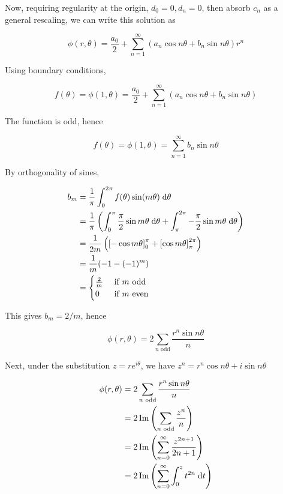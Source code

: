 \documentclass[a4paper]{article}
\begin{document}
Now, requiring regularity at the origin, $ d_{0}=0,d_{n} = 0 $, then absorb $ c_{n} $ as a general rescaling, we can write this solution as

\[ \phi(r,\theta)  = \frac{a_{0}}{2} + \sum_{n=1}^{\infty} (a_{n}  \cos n \theta + b_{n} \sin n \theta ) r^{n}  \]

Using boundary conditions,

\[ f(\theta) = \phi(1,\theta)  = \frac{a_{0}}{2} + \sum_{n=1}^{\infty} (a_{n}  \cos n \theta + b_{n} \sin n \theta ) \]


The function is odd, hence 

\[ f(\theta) = \phi(1,\theta)  = \sum_{n=1}^{\infty} b_{n} \sin n \theta \]

By orthogonality of sines, 

\begin{align*}
b_{m} & = \frac{1}{\pi} \int_{0}^{2 \pi} f(\theta) \sin (m \theta) \; \mathrm{d} \theta\\
& = \frac{1}{\pi} \left(  \int_{0}^{\pi} \frac{\pi}{2}  \sin m \theta  \; \mathrm{d} \theta + \int_{\pi}^{2\pi} - \frac{\pi}{2}  \sin m \theta \; \mathrm{d} \theta \right)   \\
& = \frac{1}{2m}  \left(  \left[  - \cos m \theta  \right]_{0}^{\pi}  + \left[  \cos m \theta \right]_{\pi}^{2\pi}  \right)  \\
& = \frac{1}{m} ( -1 - (-1)^{m}) \\
& = \begin{cases} \frac{2}{m}  & \text{ if } m \text{ odd} \\ 0 & \text{ if } m \text{ even} \end{cases}
\end{align*}

This gives $ b_{m} = 2 / m $, hence

\[ \phi(r,\theta)  = 2 \sum_{n \text{ odd}}  \frac{ r^{n} \sin n \theta }{n}  \]

Next, under the substitution $ z = r e^{i \theta} $, we have $ z^{n} = r^{n} \cos n \theta + i \sin n \theta $

\begin{align*}
\phi(r,\theta) & = 2 \sum_{n \text{ odd}}  \frac{ r^{n} \sin n \theta }{n} \\
& = 2 \operatorname{Im} \left( \sum_{n \text{ odd}} \frac{z^{n}}{n}  \right) \\
& = 2 \operatorname{Im} \left( \sum_{n = 0}^{\infty} \frac{z^{2n + 1}}{2n + 1}  \right) \\
& = 2 \operatorname{Im} \left( \sum_{n= 0}^{\infty} \int_{0}^{z} t^{2n} \; \mathrm{d} t \right) 
\end{align*}
\end{document}
